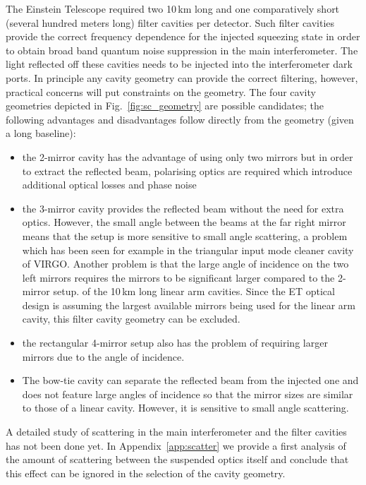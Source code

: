 The Einstein Telescope required two 10\,km long and one comparatively
short (several hundred meters long) filter cavities per detector. 
Such filter cavities provide the correct frequency dependence for the injected squeezing state
in order to obtain broad band quantum noise suppression in the main interferometer.
The light reflected off these cavities needs to be injected into the
interferometer dark ports. In principle any cavity geometry can 
provide the correct filtering, however, practical concerns will 
put constraints on the geometry. %
The four cavity geometries depicted in Fig.~\ref{fig:sc_geometry} are
possible candidates;
the following advantages and disadvantages follow directly from the
geometry (given a long baseline):
\begin{itemize} 
\item the 2-mirror cavity has the advantage of using only two mirrors but
  in order to extract the reflected beam, polarising optics are
  required which introduce additional optical losses and phase noise
\item the 3-mirror cavity provides the reflected beam without the need
  for extra optics. However, the small angle between the beams at the
  far right mirror means that the setup is more sensitive to small
  angle scattering, a problem which has been seen for example in the
  triangular input mode cleaner cavity of VIRGO. Another problem is
  that the large angle of incidence on the two left mirrors requires
  the mirrors to be significant larger compared to the 2-mirror setup.
  of the 10\,km long linear arm cavities. Since the ET optical design is 
  assuming the largest available mirrors being used for the linear arm cavity, this filter
  cavity geometry can be excluded. 
\item the rectangular 4-mirror setup also has the problem of requiring
  larger mirrors due to the angle of incidence.
\item The bow-tie cavity can separate the reflected beam from the
  injected one and does not feature large angles of
  incidence so that the mirror sizes are similar to those of a linear cavity. However, it 
  is sensitive to small angle scattering.
\end{itemize}


A detailed study of scattering in the main interferometer and the
filter cavities has not been done yet. 
In Appendix~\ref{app:scatter} we provide a first analysis of the
amount of scattering between the suspended optics itself and conclude
that this effect can be ignored in the selection of the cavity geometry. 






